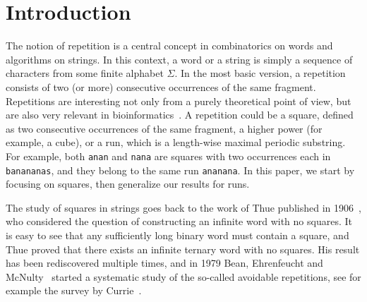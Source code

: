 \section{Introduction}

The notion of repetition is a central concept in combinatorics on words and algorithms on strings. In this context,
a word or a string is simply a sequence of characters from some finite alphabet $\Sigma$. In the most basic version,
a repetition consists of two (or more) consecutive occurrences of the same fragment. Repetitions are interesting not
only from a purely theoretical point of view, but are also very relevant in bioinformatics~\cite{Kolpakov2003}.
A repetition could be a square, defined as two consecutive occurrences of the same fragment, a higher power (for example, a cube), or a run, which is a length-wise maximal periodic substring.
For example, both \texttt{anan} and \texttt{nana} are squares with two occurrences each in \texttt{banananas}, and they belong to the same run \texttt{ananana}.
In this paper, we start by focusing on squares, then generalize our results for runs.

The study of squares in strings goes back
to the work of Thue published in 1906~\cite{thue1906}, who considered the question of constructing an infinite word
with no squares. It is easy to see that any sufficiently long binary word must contain a square, and Thue proved that
there exists an infinite ternary word with no squares. His result has been rediscovered multiple times, and in 1979
Bean, Ehrenfeucht and McNulty~\cite{BeanEM1979} started a systematic study of the so-called avoidable repetitions,
see for example the survey by Currie~\cite{Currie05}.

